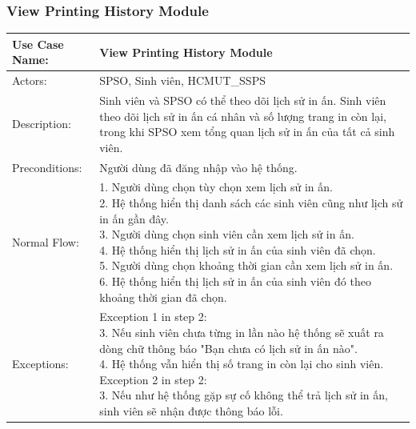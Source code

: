 \subsubsection{View Printing History Module}
\begin{table}[h!]
	\centering
	\begin{tabular}{ |p{4cm}|p{3cm}|p{3cm}|p{3cm}|  }
		\hline
		Use Case Name:    & \multicolumn{3}{l|}{View Printing History Module}                                                     \\
		\hline
		Actors:           & \multicolumn{3}{p{10cm}|}{SPSO, Sinh viên, HCMUT\_SSPS}                                               \\
		\hline
		Description:      & \multicolumn{3}{p{10cm}|}{Sinh viên và SPSO có thể theo dõi lịch sử in ấn. Sinh viên theo dõi lịch sử
		in ấn cá nhân và số lượng trang in còn lại, trong khi SPSO xem tổng quan lịch sử in ấn của tất cả sinh viên.}             \\
		\hline
		Preconditions:    & \multicolumn{3}{p{10cm}|}{Người dùng đã đăng nhập vào hệ thống.}                                      \\
		\hline
		Normal Flow:      & \multicolumn{3}{p{10cm}|}{
			1. Người dùng chọn tùy chọn xem lịch sử in ấn.\newline
			2. Hệ thống hiển thị danh sách các sinh viên cũng như lịch sử in ấn gần đây.\newline
			3. Người dùng chọn sinh viên cần xem lịch sử in ấn.\newline
			4. Hệ thống hiển thị lịch sử in ấn của sinh viên đã chọn.\newline
			5. Người dùng chọn khoảng thời gian cần xem lịch sử in ấn.\newline
			6. Hệ thống hiển thị lịch sử in ấn của sinh viên đó theo khoảng thời gian đã chọn.
		}                                                                                                                         \\
		\hline
		Exceptions:       & \multicolumn{3}{p{10cm}|}{
			Exception 1 in step 2:\newline
			3. Nếu sinh viên chưa từng in lần nào hệ thống sẽ xuất ra dòng chữ thông báo "Bạn chưa có lịch sử in ấn nào". \newline
			4. Hệ thống vẫn hiển thị số trang in còn lại cho sinh viên.
			Exception 2 in step 2:\newline
			3. Nếu như hệ thống gặp sự cố không thể trả lịch sử in ấn, sinh viên sẽ nhận được thông báo lỗi.
		}                                                                                                                         \\

\end{tabular}
\end{table}
